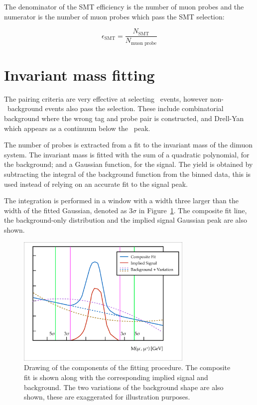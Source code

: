 The denominator of the SMT efficiency is the number of muon probes and the numerator is the number of muon probes which pass the SMT selection:

\begin{equation}
  \epsilon_{\textrm{SMT}} = \frac{N_{\textrm{SMT}}}{N_{\textrm{muon probe}}}
\end{equation}

\section{Invariant mass fitting} \label{sec:CalibrationFitting}

The pairing criteria are very effective at selecting \jpsi\ events, however non-\jpsi\ background events also pass the selection. These include combinatorial background where the wrong tag and probe pair is constructed, and Drell-Yan which appears as a continuum below the \jpsi\ peak.

The number of probes is extracted from a fit to the invariant mass of the dimuon system. The invariant mass is fitted with the sum of a quadratic polynomial, for the background; and a Gaussian function, for the signal. The yield is obtained by subtracting the integral of the background function from the binned data, this is used instead of relying on an accurate fit to the signal peak.

The integration is performed in a window with a width three larger than the width of the fitted Gaussian, denoted as $3\sigma$ in Figure~\ref{fig:CalibrationFittingExample}. The composite fit line, the background-only distribution and the implied signal Gaussian peak are also shown.

\begin{figure}[htbp]
  \centering
    \includegraphics[width=0.75\textwidth]{PartCalibration2012/Plots/FittingExample.pdf}
    \caption[Drawing of the components of the fitting procedure.]{Drawing of the components of the fitting procedure. The composite fit is shown along with the corresponding implied signal and background. The two variations of the background shape are also shown, these are exaggerated for illustration purposes.} 
  \label{fig:CalibrationFittingExample}
\end{figure}

